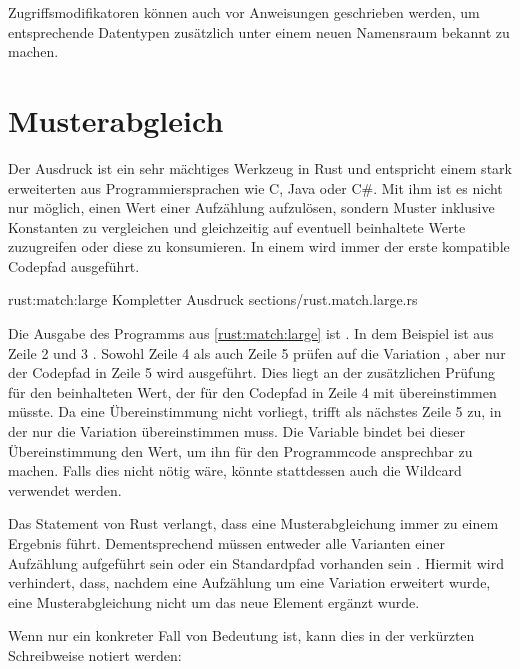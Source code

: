 Zugriffsmodifikatoren können auch vor  Anweisungen geschrieben werden, um entsprechende Datentypen zusätzlich unter einem neuen Namensraum bekannt zu machen.


\section{Musterabgleich}
\label{rust:match}

Der  Ausdruck ist ein sehr mächtiges Werkzeug in Rust und entspricht einem stark erweiterten  aus Programmiersprachen wie C, Java oder C\#.
Mit ihm ist es nicht nur möglich, einen Wert einer Aufzählung aufzulösen, sondern Muster inklusive Konstanten zu vergleichen und gleichzeitig auf eventuell beinhaltete Werte zuzugreifen oder diese zu konsumieren.
In einem  wird immer der erste kompatible Codepfad ausgeführt.

\rustcinclude
	{rust:match:large}
	{Kompletter  Ausdruck}
	{sections/rust.match.large.rs}

Die Ausgabe des Programms aus \autoref{rust:match:large} ist .
In dem Beispiel ist  aus Zeile 2 und 3 .
Sowohl Zeile 4 als auch Zeile 5 prüfen auf die Variation , aber nur der Codepfad in Zeile 5 wird ausgeführt.
Dies liegt an der zusätzlichen Prüfung für den beinhalteten Wert, der für den Codepfad in Zeile 4 mit  übereinstimmen müsste.
Da eine Übereinstimmung nicht vorliegt, trifft als nächstes Zeile 5 zu, in der nur die Variation  übereinstimmen muss.
Die Variable  bindet bei dieser Übereinstimmung den Wert, um ihn für den Programmcode ansprechbar zu machen.
Falls dies nicht nötig wäre, könnte stattdessen auch die Wildcard \rustcinline{_} verwendet werden.

Das  Statement von Rust verlangt, dass eine Musterabgleichung immer zu einem Ergebnis führt.
Dementsprechend müssen entweder alle Varianten einer Aufzählung aufgeführt sein oder ein Standardpfad vorhanden sein \rustcinline{_ => \{ \} }.
Hiermit wird verhindert, dass, nachdem eine Aufzählung um eine Variation erweitert wurde, eine Musterabgleichung nicht um das neue Element ergänzt wurde.

Wenn nur ein konkreter Fall von Bedeutung ist, kann dies in der verkürzten  Schreibweise notiert werden:

